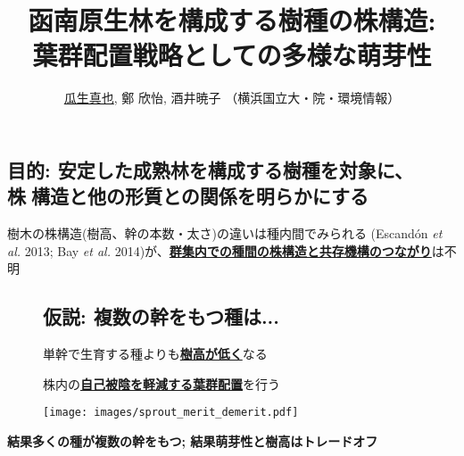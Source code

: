 \documentclass[a0, 30pt, plainboxedsections]{sciposter} %
\title{\textcolor{Blue1}{函南原生林を構成する樹種の株構造:\\\vspace{-0.2em} 葉群配置戦略としての多様な萌芽性}}
\author{\underline{瓜生真也}, 鄭 欣怡, 酒井暁子 （横浜国立大・院・環境情報） \normalsize{\faEnvelope \hspace{0.02em} \fontspec{HelveticaNeue-Italic}{suika1127@gmail.com}}}
\begin{document}
\maketitle
\vspace{-2em}
\begin{multicols}{2}
\begin{mdframed}[style=section.frame]
  \centering\LARGE\textbf{\color{white}{はじめに}}
\end{mdframed}

\vspace{-0.6em}\subsection*{目的: 安定した成熟林を構成する樹種を対象に、\\\hspace*{10em}株構造と他の形質との関係を明らかにする}

樹木の株構造(樹高、幹の本数・太さ)の違いは種内間でみられる {\footnotesize(Escandón \textit{et al.} 2013; Bay \textit{et al.} 2014)}が、\textbf{\underline{群集内での種間の株構造と共存機構のつながり}}は不明

\vspace{-0.6em}\begin{figure}
 \begin{minipage}{0.6\hsize}
 \subsection*{仮説: 複数の幹をもつ種は...}
   単幹で生育する種よりも\underline{\textbf{樹高が低く}}なる
  
   株内の\underline{\textbf{自己被陰を軽減する葉群配置}}を行う
 \end{minipage}
 \begin{minipage}{0.4\hsize}
  \centering
   \texttt{[image: images/sprout\_merit\_demerit.pdf]}  
 \end{minipage}
\end{figure}

\columnbreak
\begin{mdframed}[style=conclusion.frame,frametitle={\textbf{\Large{\faFlagAlt \vspace{0.02em} 結論: {萌芽性は樹高と背反的に進化しており、\\\hspace*{2.8em}群集の中に多様な萌芽性をもつ種が存在する}}}}]
  \vspace{0.4em}
  \flushleft
  \normalsize{
  \textbf{結果多くの種が複数の幹をもつ; 結果萌芽性と樹高はトレードオフ}
  
}
\end{mdframed}
\end{multicols}
\end{document}
